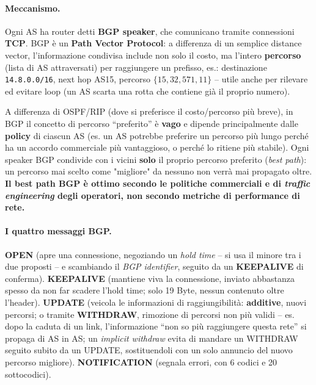 \documentclass[12pt, a4paper]{article}
\begin{document}
\paragraph{Meccanismo.} Ogni AS ha router detti \textbf{BGP speaker}, che comunicano tramite connessioni \textbf{TCP}. BGP è un \textbf{Path Vector Protocol}: a differenza di un semplice distance vector, l'informazione condivisa include non solo il costo, ma l'intero \textbf{percorso} (lista di AS attraversati) per raggiungere un prefisso, es.: destinazione \texttt{14.8.0.0/16}, next hop AS15, percorso $\{15,32,571,11\}$ -- utile anche per rilevare ed evitare loop (un AS scarta una rotta che contiene già il proprio numero).

\begin{tcolorbox}[colback=cyan!5, colframe=blue!40!black, title=\textbf{Il ``best path'' BGP non è il percorso più veloce}]
A differenza di OSPF/RIP (dove si preferisce il costo/percorso più breve), in BGP il concetto di percorso ``preferito'' è \textbf{vago} e dipende principalmente dalle \textbf{policy} di ciascun AS (es. un AS potrebbe preferire un percorso più lungo perché ha un accordo commerciale più vantaggioso, o perché lo ritiene più stabile). Ogni speaker BGP condivide con i vicini \textbf{solo} il proprio percorso preferito (\textit{best path}): un percorso mai scelto come "migliore" da nessuno non verrà mai propagato oltre. \textbf{Il best path BGP è ottimo secondo le politiche commerciali e di \textit{traffic engineering} degli operatori, non secondo metriche di performance di rete.}
\end{tcolorbox}

\paragraph{I quattro messaggi BGP.} \textbf{OPEN} (apre una connessione, negoziando un \textit{hold time} -- si usa il minore tra i due proposti -- e scambiando il \textit{BGP identifier}, seguito da un \textbf{KEEPALIVE} di conferma). \textbf{KEEPALIVE} (mantiene viva la connessione, inviato abbastanza spesso da non far scadere l'hold time; solo 19 Byte, nessun contenuto oltre l'header). \textbf{UPDATE} (veicola le informazioni di raggiungibilità: \textbf{additive}, nuovi percorsi; o tramite \textbf{WITHDRAW}, rimozione di percorsi non più validi -- es. dopo la caduta di un link, l'informazione ``non so più raggiungere questa rete'' si propaga di AS in AS; un \textit{implicit withdraw} evita di mandare un WITHDRAW seguito subito da un UPDATE, sostituendoli con un solo annuncio del nuovo percorso migliore). \textbf{NOTIFICATION} (segnala errori, con 6 codici e 20 sottocodici).
\end{document}
